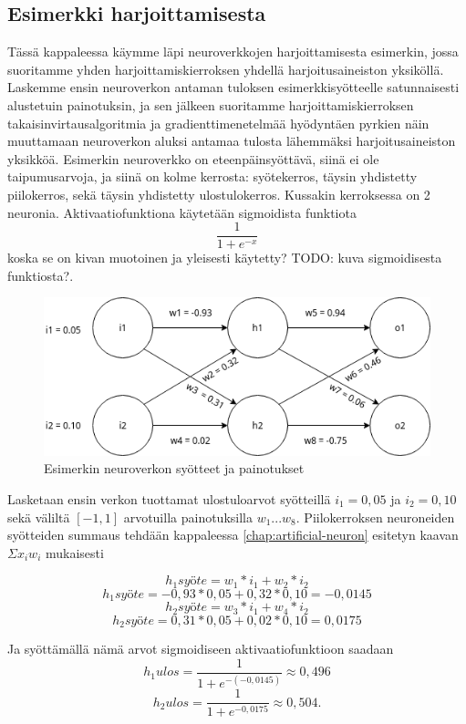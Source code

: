 \documentclass[finnish]{tktltiki2}
\theoremstyle{definition}
\theoremstyle{remark}
\begin{document}
  \subsection{Esimerkki harjoittamisesta}


  Tässä kappaleessa käymme läpi neuroverkkojen harjoittamisesta esimerkin, jossa suoritamme yhden harjoittamiskierroksen yhdellä harjoitusaineiston yksiköllä. Laskemme ensin neuroverkon antaman tuloksen esimerkkisyötteelle satunnaisesti alustetuin painotuksin, ja sen jälkeen suoritamme harjoittamiskierroksen takaisinvirtausalgoritmia ja gradienttimenetelmää hyödyntäen pyrkien näin muuttamaan neuroverkon aluksi antamaa tulosta lähemmäksi harjoitusaineiston yksikköä. Esimerkin neuroverkko on eteenpäinsyöttävä, siinä ei ole taipumusarvoja, ja siinä on kolme kerrosta: syötekerros, täysin yhdistetty piilokerros, sekä täysin yhdistetty ulostulokerros. Kussakin kerroksessa on 2 neuronia. Aktivaatiofunktiona käytetään sigmoidista funktiota $$ \frac{1}{1 + e^{-x}} $$ koska se on kivan muotoinen ja yleisesti käytetty? TODO: kuva sigmoidisesta funktiosta?.

    \begin{figure}[h]
    \centering
    \includegraphics[scale=0.6]{draw-io-backprop-example}
    \caption{Esimerkin neuroverkon syötteet ja painotukset}
    \label{pic:backprop-example}
    \end{figure}

  Lasketaan ensin verkon tuottamat ulostuloarvot syötteillä $i_1 = 0,05$ ja $i_2 = 0,10$ sekä väliltä $[-1, 1]$ arvotuilla painotuksilla $w_1...w_8$. Piilokerroksen neuroneiden syötteiden summaus tehdään kappaleessa \ref{chap:artificial-neuron} esitetyn kaavan $\Sigma x_i w_i$ mukaisesti
  
  $$h_{1}syöte = w_1 * i_1 + w_2 * i_2$$
  $$h_{1}syöte = -0,93 * 0,05 + 0,32 * 0,10 = -0,0145$$
  $$h_{2}syöte = w_3 * i_1 + w_4 * i_2$$
  $$h_{2}syöte = 0,31 * 0,05 + 0,02 * 0,10 = 0,0175$$

  Ja syöttämällä nämä arvot sigmoidiseen aktivaatiofunktioon saadaan
  $$h_{1}ulos = \frac{1}{1 + e^{-(-0,0145)}} \approx 0,496$$
  $$h_{2}ulos = \frac{1}{1 + e^{-0,0175}} \approx 0,504.$$
\end{document}
